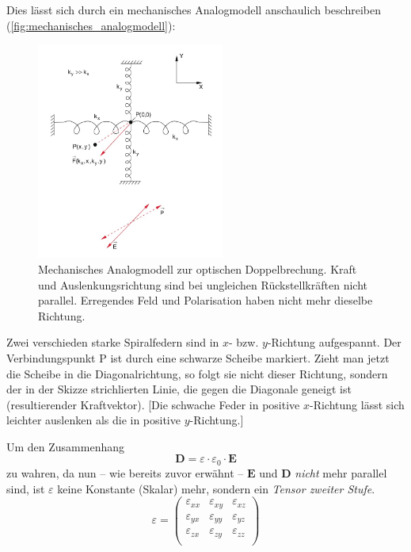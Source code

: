 \documentclass[a4paper, 11pt, ngerman, parskip=half-]{scrartcl}
\begin{document}
Dies lässt sich durch ein mechanisches Analogmodell anschaulich beschreiben (\autoref{fig:mechanisches_analogmodell}):
%
\begin{figure}[!h]
    \centering
    \begin{samepage}
        \includegraphics[width=0.55\textwidth]{image/15/mechanisches_modell.jpg}
        \caption{Mechanisches Analogmodell zur optischen Doppelbrechung. Kraft und Auslenkungsrichtung sind bei ungleichen Rückstellkräften nicht parallel. Erregendes Feld und Polarisation haben nicht mehr dieselbe Richtung.}
        \label{fig:mechanisches_analogmodell}
    \end{samepage}
\end{figure}
%
Zwei verschieden starke Spiralfedern sind in $x$- bzw. $y$-Richtung aufgespannt. Der Verbindungspunkt P ist durch eine schwarze Scheibe markiert. Zieht man jetzt die Scheibe in die Diagonalrichtung, so folgt sie nicht dieser Richtung, sondern der in der Skizze strichlierten Linie, die gegen die Diagonale geneigt ist (resultierender Kraftvektor). [Die schwache Feder in positive $x$-Richtung lässt sich leichter auslenken als die in positive $y$-Richtung.]

Um den Zusammenhang
\[\textbf{D} = \varepsilon \cdot \varepsilon_0 \cdot \textbf{E}\]
zu wahren, da nun -- wie bereits zuvor erwähnt -- $\textbf{E}$ und  $\textbf{D}$ \textit{nicht} mehr parallel sind, ist $\varepsilon$ keine Konstante (Skalar) mehr, sondern ein \textit{Tensor zweiter Stufe}.
\[\varepsilon = \begin{pmatrix}
        \varepsilon_{xx} & \varepsilon_{xy} & \varepsilon_{xz} \\
        \varepsilon_{yx} & \varepsilon_{yy} & \varepsilon_{yz} \\
        \varepsilon_{zx} & \varepsilon_{zy} & \varepsilon_{zz} \\
    \end{pmatrix}\]
\end{document}
